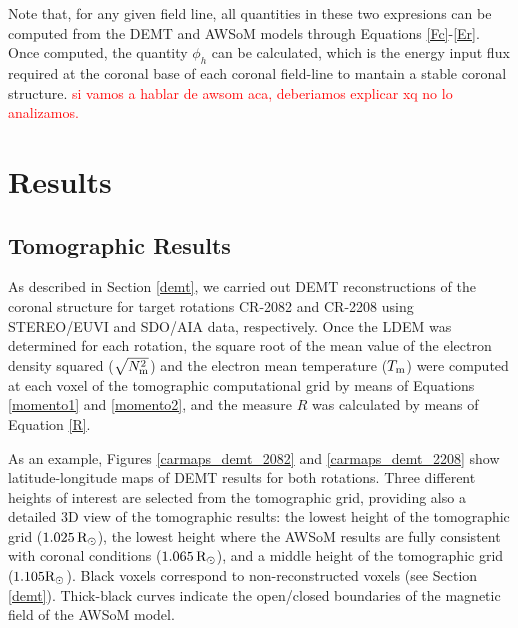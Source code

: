 \documentclass[namedreferences]{solarphysics}
\newcommand{\mrsun}{{\rm R_\odot}}
\newcommand{\Tm}{T_{\rm m}}
\newcommand{\Nsqm}{N^2_{{\rm m}}}
\newcommand{\sqravgN}{\sqrt{\Nsqm}}
\def\diego#1{\textcolor{red}{#1}}
\begin{document}
\begin{article}
{Note that, for any given field line, all quantities in these two expresions can be computed from the DEMT and AWSoM models through Equations \ref{Fc}-\ref{Er}. Once computed, the quantity $\phi_h$ can be calculated, which is the energy input flux required at the coronal base of each coronal field-line to mantain a stable coronal structure.}
\diego{si vamos a hablar de awsom aca, deberiamos explicar xq no lo analizamos.}

\section{Results}\label{resu} 

\subsection{Tomographic Results}\label{demt_res} 

{As described in Section \ref{demt}, we carried out DEMT reconstructions of the coronal structure for target rotations CR-2082 and CR-2208 using STEREO/EUVI and SDO/AIA data, respectively.} {Once the LDEM was determined for each rotation, the square root of the mean value of the electron density squared ($\sqravgN$) and the electron mean temperature ($\Tm$) were computed at each voxel of the tomographic computational grid by means of Equations \ref{momento1} and \ref{momento2}{, and the measure $R$ was calculated by means of Equation \ref{R}.}} 

{As an example,} Figures \ref{carmaps_demt_2082} and \ref{carmaps_demt_2208} show {latitude-longitude} maps of DEMT results for both {rotations. Three different heights {of interest are selected from the tomographic grid}, providing also a detailed 3D view of the tomographic results: the lowest height of {the} tomographic grid ($1.025\,\mrsun$), {the lowest height where the AWSoM results are fully} consistent with coronal conditions ($1.065\,\mrsun$), and a middle height of the tomographic grid ($1.105\mrsun$)}. Black voxels correspond to non-reconstructed voxels ({see} Section \ref{demt}). Thick-black {curves indicate} the {open/closed boundaries of the magnetic field of the} AWSoM model. 


\end{article}
\end{document}
